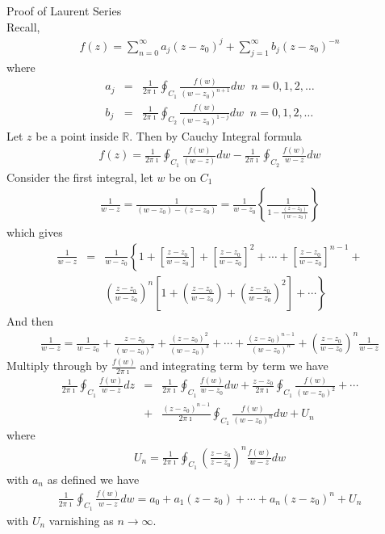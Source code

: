\documentclass[12pt]{report}
\newcommand{\sps}{\\[0.2cm]}
\newcommand{\dsp}{\displaystyle}
\newcommand{\NI}{\noindent}
\newcommand{\real}{ \mathbb{R}}
\newcommand{\imaginary}{\imath}
\begin{document}
	\NI Proof of Laurent Series
	\\Recall,
	\begin{eqnarray*}
		f(z) = \sum_{n=0}^{\infty}a_j(z-z_0)^j + \sum_{j=1}^{\infty}b_j(z-z_0)^{-n}
	\end{eqnarray*}
	where
	\begin{eqnarray*}
		a_j &=& \frac{1}{2\pi\imaginary}\oint_{C_1}\frac{f(w)}{(w-z_0)^{n+1}}dw\;\; n=0,1,2,\ldots\sps
		b_j &=& \frac{1}{2\pi\imaginary}\oint_{C_2}\frac{f(w)}{(w-z_0)^{1-j}}dw\;\; n=0,1,2,\ldots
	\end{eqnarray*}
	Let $z$ be a point inside $\real$. Then by Cauchy Integral formula
	\begin{eqnarray*}
		f(z) = \frac{1}{2\pi\imaginary}\oint_{C_1}\frac{f(w)}{(w-z)}dw - \frac{1}{2\pi\imaginary}\oint_{C_2}\frac{f(w)}{w-z}dw
	\end{eqnarray*}
	Consider the first integral, let $w$ be on $C_1$
	\begin{eqnarray*}
		\frac{1}{w-z} = \frac{1}{(w-z_0)-(z-z_0)} = \frac{1}{w-z_0}\left\{\frac{1}{1-\frac{(z-z_0)}{(w-z_0)}}\right\}
	\end{eqnarray*}
	which gives
	\begin{eqnarray*}
		\frac{1}{w-z} &=& \frac{1}{w-z_0}\left\{1+ \left[\frac{z-z_0}{w-z_0}\right] + \left[\frac{z-z_0}{w-z_0}\right]^2 + \cdots + \left[\frac{z-z_0}{w-z_0}\right]^{n-1} +\right. \sps
		 && \left. \left(\frac{z-z_0}{w-z_0}\right)^n\left[ 1 + \left(\frac{z-z_0}{w-z_0}\right) + \left(\frac{z-z_0}{w-z_0}\right)^2 \right] + \cdots  \right\}
	\end{eqnarray*}
	And then
	\begin{eqnarray*}
		\frac{1}{w-z} = \frac{1}{w-z_0} + \frac{z-z_0}{(w-z_0)^2} + \frac{(z-z_0)^2}{(w-z_0)^3} + \cdots + \frac{(z-z_0)^{n-1}}{(w-z_0)^n} + \left(\frac{z-z_0}{w-z_0}\right)^n\frac{1}{w-z}
	\end{eqnarray*}
	Multiply through by $\dsp \frac{f(w)}{2\pi\imaginary}$ and integrating term by term we have
	\begin{eqnarray*}
		\frac{1}{2\pi \imaginary}\oint_{C_1}\frac{f(w)}{w-z}dz &=& \frac{1}{2\pi\imaginary}\oint_{C_1}\frac{f(w)}{w-z_0} dw + \frac{z-z_0}{2\pi\imaginary}\oint_{C_1}\frac{f(w)}{(w-z_0)^2}+ \cdots \sps
		&+&\frac{(z-z_0)^{n-1}}{2\pi\imaginary}\oint_{C_1}\frac{f(w)}{(w-z_0)^n}dw + U_n
	\end{eqnarray*}
	where 
	\begin{eqnarray*}
		U_n = \frac{1}{2\pi\imaginary}\oint_{C_1}\left(\frac{z-z_0}{z-z_0}\right)^n \frac{f(w)}{w-z}dw
	\end{eqnarray*}
	with $a_n$ as defined we have 
	\begin{eqnarray*}
		\frac{1}{2\pi\imaginary}\oint_{C_1}\frac{f(w)}{w-z}dw = a_0 + a_1(z-z_0) + \cdots + a_n(z-z_0)^n + U_n
	\end{eqnarray*}
	with $U_n$ varnishing as $n\rightarrow\infty$.\\
	
\end{document}

